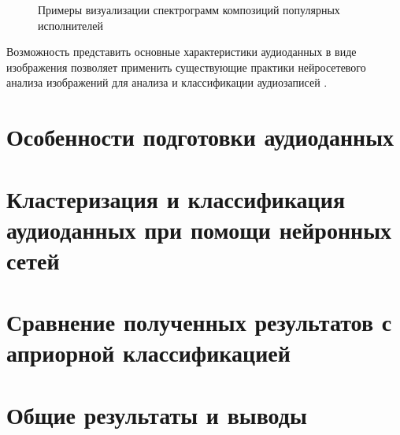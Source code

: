 \begin{figure}[H]
	\caption{Примеры визуализации спектрограмм композиций популярных исполнителей}
\end{figure}

Возможность представить основные характеристики аудиоданных в виде изображения позволяет применить существующие практики
нейросетевого анализа изображений для анализа и классификации аудиозаписей \cite{cyber_alex}.

\chapter{Особенности подготовки аудиоданных}


\chapter{Кластеризация и классификация аудиоданных при помощи нейронных сетей}
\chapter{Сравнение полученных результатов с априорной классификацией}
\chapter{Общие результаты и выводы}